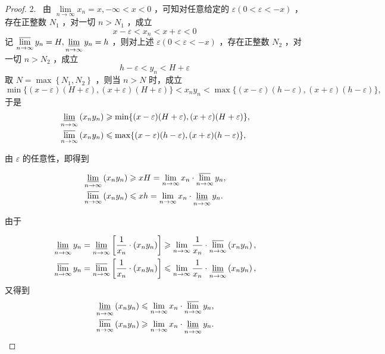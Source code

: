 \begin{proof}
	2.~ 由 $\lim\limits _{n \rightarrow \infty} x_n=x,-\infty<x<0$ ，可知对任意给定的 $\varepsilon(0<\varepsilon<-x)$ ，存在正整数 $N_1$ ，对一切 $n>N_1$ ，成立
	$$
	x-\varepsilon<x_n<x+\varepsilon<0
	$$
	记 $\varlimsup\limits_{n \rightarrow \infty} y_n=H, \varliminf\limits _{n \rightarrow \infty} y_n=h$ ，则对上述 $\varepsilon(0<\varepsilon<-x)$ ，存在正整数 $N_2$ ，对一切 $n>N_2$ ，成立
	$$
	h-\varepsilon<y_n<H+\varepsilon
	$$
	取 $N=\max \left\{N_1, N_2\right\}$ ，则当 $n>N$ 时，成立
	$$
	\min \{(x-\varepsilon)(H+\varepsilon),(x+\varepsilon)(H+\varepsilon)\}<x_n y_n<\max \{(x-\varepsilon)(h-\varepsilon),(x+\varepsilon)(h-\varepsilon)\},
	$$
	于是
	$$
	\begin{aligned}
		& \varliminf\limits _{n \rightarrow \infty}\left(x_n y_n\right) \geqslant \min \{(x-\varepsilon)(H+\varepsilon),(x+\varepsilon)(H+\varepsilon)\}, \\
		& \varlimsup\limits_{n \rightarrow \infty}\left(x_n y_n\right) \leqslant \max \{(x-\varepsilon)(h-\varepsilon),(x+\varepsilon)(h-\varepsilon)\},
	\end{aligned}
	$$
	
	
	由 $\varepsilon$ 的任意性，即得到
	
	$$
	\begin{aligned}
		& \varliminf\limits _{n \rightarrow \infty}\left(x_n y_n\right) \geqslant x H=\lim _{n \rightarrow \infty} x_n \cdot \varlimsup\limits _{n \rightarrow \infty} y_n, \\
		& \varlimsup\limits_{n \rightarrow \infty}\left(x_n y_n\right) \leqslant x h=\lim _{n \rightarrow \infty} x_n \cdot \varliminf\limits_{n \rightarrow \infty} y_n .
	\end{aligned}
	$$
	
	
	由于
	
	$$
	\begin{aligned}
		& \varliminf\limits _{n \rightarrow \infty} y_n=\varliminf\limits _{n \rightarrow \infty}\left[\frac{1}{x_n} \cdot\left(x_n y_n\right)\right] \geqslant \lim _{n \rightarrow \infty} \frac{1}{x_n} \cdot \varlimsup_{n \rightarrow \infty}\left(x_n y_n\right), \\
		& \varlimsup_{n \rightarrow \infty} y_n=\varlimsup_{n \rightarrow \infty}\left[\frac{1}{x_n} \cdot\left(x_n y_n\right)\right] \leqslant \lim _{n \rightarrow \infty} \frac{1}{x_n} \cdot \varliminf\limits_{n \rightarrow \infty}\left(x_n y_n\right),
	\end{aligned}
	$$
	又得到
	$$
	\begin{aligned}
		& \varliminf\limits _{n \rightarrow \infty}\left(x_n y_n\right) \leqslant \lim _{n \rightarrow \infty} x_n \cdot \varlimsup_{n \rightarrow \infty} y_n, \\
		& \varlimsup_{n \rightarrow \infty}\left(x_n y_n\right) \geqslant \lim _{n \rightarrow \infty} x_n \cdot \varliminf\limits _{n \rightarrow \infty} y_n .
	\end{aligned}
	$$
	

\end{proof}
